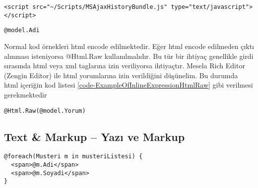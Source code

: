 \documentclass[10pt,a4paper]{article}
\begin{document}
\begin{lstlisting}[label=code-ExampleOfInlineExpression2,caption=html içinde kod örneği 2]
<script src="~/Scripts/MSAjaxHistoryBundle.js" type="text/javascript"></script>
\end{lstlisting}


\begin{lstlisting}[label=code-ExampleOfInlineExpression3,caption=html içinde kod örneği 3]
@model.Adi
\end{lstlisting}

Normal kod örnekleri html encode edilmektedir.
Eğer html encode edilmeden çıktı alınması isteniyorsa @Html.Raw kullanılmalıdır.
Bu tür bir ihtiyaç genellikle girdi sırasında html veya xml taglarına izin veriliyorsa ihtiyaçtır.
Mesela Rich Editor (Zengin Editor) ile html yorumlarına izin verildiğini düşünelim.
Bu durumda html içeriğin kod listesi \ref{code-ExampleOfInlineExpressionHtmlRaw}
gibi verilmesi gerekmektedir

\begin{lstlisting}[label=code-ExampleOfInlineExpressionHtmlRaw,caption=html içinde kod örneği html encode yapılmadan]
@Html.Raw(@model.Yorum)
\end{lstlisting}


\subsection{Text \& Markup -- Yazı ve Markup}

\begin{lstlisting}[label=code-TextAndMarkup,caption=Yazı ve Markup]
@foreach(Musteri m in musteriListesi) {
  <span>@m.Adi</span> 
  <span>@m.Soyadi</span> 
}
\end{lstlisting}











% 

\end{document}
